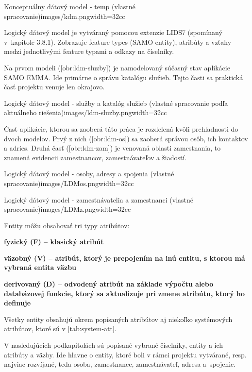 {Konceptuálny dátový model - temp (vlastné spracovanie)}{images/kdm.png}{width=32cc}

\zlom
{}
Logický dátový model je vytváraný pomocou extenzie LIDS7 (spomínaný v~kapitole 3.8.1). Zobrazuje feature types (SAMO entity), atribúty a vzťahy medzi jednotlivými feature typami a odkazy na číselníky.

Na prvom modeli ([obr:ldm-sluzby]) je namodelovaný súčasný stav aplikácie SAMO EMMA. Ide primárne o správu katalógu služieb. Tejto časti sa praktická časť projektu venuje len okrajovo.

{Logický dátový model - služby a katalóg služieb (vlastné spracovanie podľa aktuálneho riešenia)}{images/ldm-sluzby.png}{width=32cc}

Časť aplikácie, ktorou sa zaoberá táto práca je rozdelená kvôli prehľadnosti do dvoch modelov. Prvý z nich ([obr:ldm-os]) sa zaoberá správou osôb, ich kontaktov a adries. Druhá časť ([obr:ldm-zam]) je venovaná oblasti zamestnania, to znamená evidencii zamestnancov, zamestnávateľov a žiadostí.

{Logický dátový model - osoby, adresy a spojenia (vlastné spracovanie)}{images/LDMos.png}{width=32cc}

{Logický dátový model - zamestnávatelia a zamestnanci (vlastné spracovanie)}{images/LDMz.png}{width=32cc}


Entity môžu obsahovať tri typy atribútov:

\startitemize
\item {\start\bf fyzický (F) \stop -- klasický atribút}
\item {\start\bf väzobný (V) \stop -- atribút, ktorý je prepojením na inú entitu, s ktorou má vybraná entita väzbu}
\item {\start\bf derivovaný (D) \stop -- odvodený atribút na základe výpočtu alebo databázovej funkcie, ktorý sa aktualizuje pri zmene atribútu, ktorý ho definuje}
\stopitemize

Všetky entity obsahujú okrem popísaných atribútov aj niekoľko systémových atribútov, ktoré sú v [tab:system-att].


V nasledujúcich podkapitolách sú popísané vybrané číselníky, entity a ich atribúty a väzby. Ide hlavne o entity, ktoré boli v rámci projektu vytvárané, resp. najviac rozvíjané, teda osoba, zamestnanec, zamestnávateľ, adresa a~spojenie.

